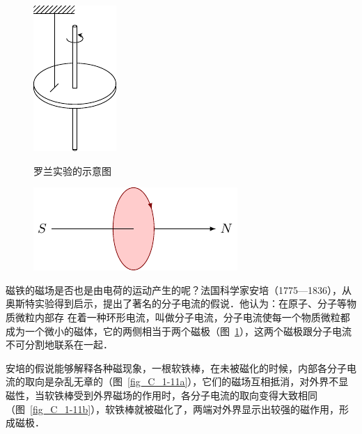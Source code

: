 \begin{figure}[htbp]
    \centering
    \begin{minipage}[t]{0.48\textwidth}
    	\centering
        \includegraphics{fig/C/1-9.pdf}
        \caption{罗兰实验的示意图}\label{fig_C_1-9}
    \end{minipage}
    \begin{minipage}[t]{0.48\textwidth}
        \centering
        \includegraphics{fig/C/1-10.pdf}
        \caption{}\label{fig_C_1-10}
    \end{minipage}
\end{figure}


磁铁的磁场是否也是由电荷的运动产生的呢？法国科学家安培（1775—1836），从奥斯特实验得到启示，提出了著名的分子电流的假说．他认为：在原子、分子等物质微粒内部存
在着一种环形电流，叫做分子电流，分子电流使每一个物质微粒都成为一个微小的磁体，它的两侧相当于两个磁极（图~\ref{fig_C_1-10}），这两个磁极跟分子电流不可分割地联系在一起．


安培的假说能够解释各种磁现象，一根软铁棒，在未被磁化的时候，内部各分子电流的取向是杂乱无章的（图~\ref{fig_C_1-11a}），它们的磁场互相抵消，对外界不显磁性，当软铁棒受到外界磁场的作用时，各分子电流的取向变得大致相同（图~\ref{fig_C_1-11b}），软铁棒就被磁化了，两端对外界显示出较强的磁作用，形成磁极．

